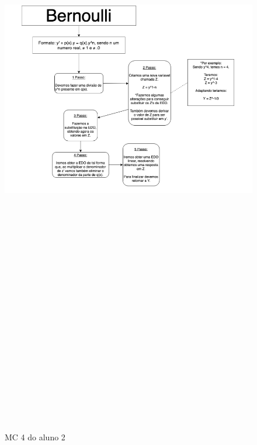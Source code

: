 \begin{landscape}
\begin{figure}[H]
\centering
\caption{MC 4 do aluno 2}
\includegraphics[width=190mm, height=300mm,keepaspectratio]{figuras/MC/mc2_4.png}
\label{mc4a2}
\end{figure}
\end{landscape}

